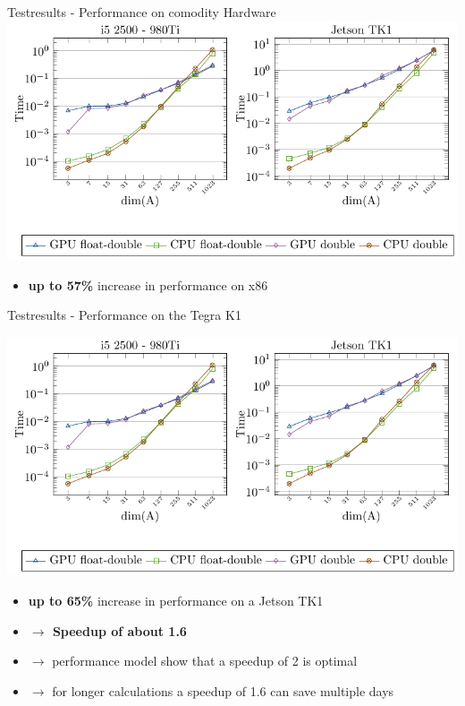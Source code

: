 \documentclass[10pt]{beamer}
\begin{document}
\begin{frame}{Testresults - Performance on comodity Hardware}
  \includegraphics[width=\textwidth]{figures/z-plots3.pdf} %
  \begin{itemize}
 \item \textbf{\color{red} up to 57\%} increase in performance on x86
\end{itemize}
\end{frame}


\begin{frame}{Testresults - Performance on the Tegra K1}
\begin{center}
\includegraphics[width=\textwidth]{figures/z-plots3.pdf} %
\end{center}
\begin{itemize}
 \item \textbf{\color{red} up to 65\%} increase in performance on a Jetson TK1
 \item \textbf{ $\rightarrow$ Speedup of about \color{red} 1.6}
 \item \color{black} $\rightarrow$ performance model show that a speedup of 2 is optimal 
 \item \color{black} $\rightarrow$ for longer calculations a speedup of 1.6 can save multiple days
\end{itemize}
\end{frame}
\end{document}
